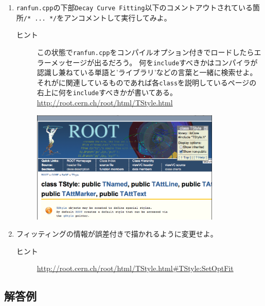 \documentclass{jarticle}
\begin{document}
\begin{enumerate}
   \item \verb|ranfun.cpp|の下部\verb|Decay Curve Fitting|以下のコメントアウトされている箇所\verb|/* ... */|をアンコメントして実行してみよ。
	 \begin{description}
	  \item[ヒント] この状態で\verb|ranfun.cpp|をコンパイルオプション付きでロードしたらエラーメッセージが出るだろう。
		     何を\verb|include|すべきかはコンパイラが認識し兼ねている単語と'ライブラリ'などの言葉と一緒に検索せよ。
		     それが\ROOT に関連しているものであれば各\verb|class|を説明しているページの右上に何を\verb|include|すべきかが書いてある。\\
		     \url{http://root.cern.ch/root/html/TStyle.html}
	 \end{description}
	 \begin{figure}[htbp]
	  \begin{center}
	   \includegraphics[width = 90mm]{./picture/classinclude.eps}
	  \end{center}
	  \label{Fig:classinclude}
	 \end{figure}
   \item フィッティングの情報が誤差付きで描かれるように変更せよ。
	 \begin{description}
	  \item[ヒント]  \url{http://root.cern.ch/root/html/TStyle.html#TStyle:SetOptFit}
	 \end{description}
  \end{enumerate}

  \subsection{解答例}
\end{document}
